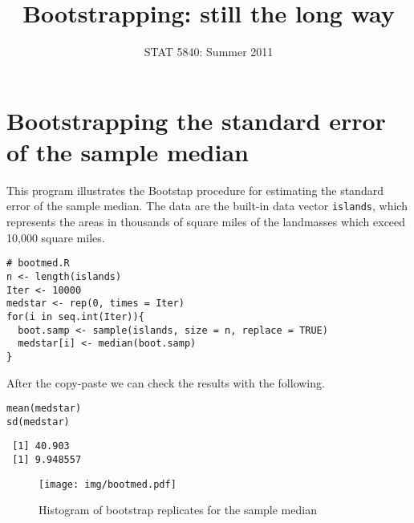 \documentclass[11pt,english]{article}
\title{Bootstrapping: still the long way}
\date{STAT 5840: Summer 2011}
\begin{document}
\maketitle

\thispagestyle{empty}

\section*{Bootstrapping the standard error of the sample median}
\label{sec-1}

This program illustrates the Bootstap procedure for estimating the standard error of the sample median.  The data are the built-in data vector \texttt{islands}, which represents the areas in thousands of square miles of the landmasses which exceed 10,000 square miles.



\begin{verbatim}
# bootmed.R
n <- length(islands)     
Iter <- 10000
medstar <- rep(0, times = Iter)
for(i in seq.int(Iter)){
  boot.samp <- sample(islands, size = n, replace = TRUE)
  medstar[i] <- median(boot.samp)
}
\end{verbatim}

After the copy-paste we can check the results with the following.
\begin{verbatim}
mean(medstar)
sd(medstar)
\end{verbatim}

\begin{verbatim}
 [1] 40.903
 [1] 9.948557
\end{verbatim}



\begin{figure}[h!]
\centering
\texttt{[image: img/bootmed.pdf]}
\caption{\label{fig:yplot}Histogram of bootstrap replicates for the sample median}
\end{figure}
\end{document}
